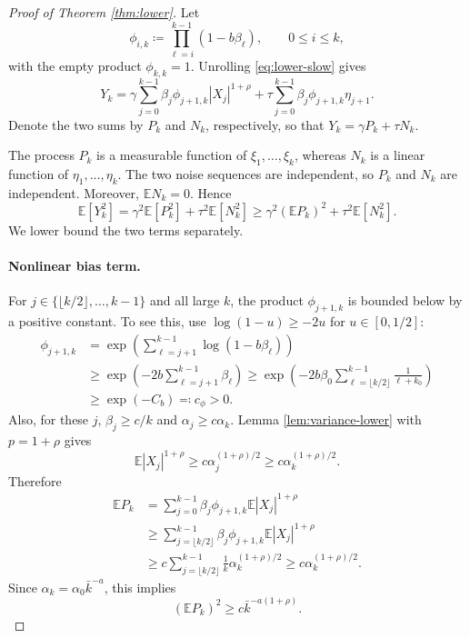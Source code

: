 \documentclass{article}
\newcommand{\E}{\mathbb{E}}
\begin{document}
\begin{proof}[Proof of Theorem \ref{thm:lower}]
Let
\[
  \phi_{i,k}\coloneqq \prod_{\ell=i}^{k-1}(1-b\beta_\ell),\qquad 0\le i\le k,
\]
with the empty product $\phi_{k,k}=1$. Unrolling \eqref{eq:lower-slow} gives
\begin{equation}
  Y_k=\gamma\sum_{j=0}^{k-1}\beta_j\phi_{j+1,k}|X_j|^{1+\rho}
      +\tau\sum_{j=0}^{k-1}\beta_j\phi_{j+1,k}\eta_{j+1}. \label{eq:Y-lower-unrolled}
\end{equation}
Denote the two sums by $P_k$ and $N_k$, respectively, so that $Y_k=\gamma P_k+\tau N_k$.

The process $P_k$ is a measurable function of $\xi_1,\ldots,\xi_k$, whereas $N_k$ is a linear function of $\eta_1,\ldots,\eta_k$. The two noise sequences are independent, so $P_k$ and $N_k$ are independent. Moreover, $\E N_k=0$. Hence
\begin{equation}
  \E[Y_k^2]
  =\gamma^2\E[P_k^2]+\tau^2\E[N_k^2]
  \ge \gamma^2(\E P_k)^2+\tau^2\E[N_k^2]. \label{eq:lower-split}
\end{equation}
We lower bound the two terms separately.

\paragraph{Nonlinear bias term.}
For $j\in\{\lfloor k/2\rfloor,\ldots,k-1\}$ and all large $k$, the product $\phi_{j+1,k}$ is bounded below by a positive constant. To see this, use $\log(1-u)\ge-2u$ for $u\in[0,1/2]$:
\[
\begin{aligned}
  \phi_{j+1,k}
  &=\exp\left(\sum_{\ell=j+1}^{k-1}\log(1-b\beta_\ell)\right)\\
  &\ge \exp\left(-2b\sum_{\ell=j+1}^{k-1}\beta_\ell\right)
   \ge \exp\left(-2b\beta_0\sum_{\ell=\lfloor k/2\rfloor}^{k-1}\frac1{\ell+k_0}\right)\\
  &\ge \exp(-C_b)\eqqcolon c_\phi>0.
\end{aligned}
\]
Also, for these $j$, $\beta_j\ge c/k$ and $\alpha_j\ge c\alpha_k$. Lemma \ref{lem:variance-lower} with $p=1+\rho$ gives
\[
  \E|X_j|^{1+\rho}\ge c\alpha_j^{(1+\rho)/2}
  \ge c\alpha_k^{(1+\rho)/2}.
\]
Therefore
\[
\begin{aligned}
  \E P_k
  &=\sum_{j=0}^{k-1}\beta_j\phi_{j+1,k}\E|X_j|^{1+\rho}\\
  &\ge \sum_{j=\lfloor k/2\rfloor}^{k-1}\beta_j\phi_{j+1,k}\E|X_j|^{1+\rho}\\
  &\ge c\sum_{j=\lfloor k/2\rfloor}^{k-1}\frac1{k}\alpha_k^{(1+\rho)/2}
   \ge c\alpha_k^{(1+\rho)/2}.
\end{aligned}
\]
Since $\alpha_k=\alpha_0\bar k^{-a}$, this implies
\begin{equation}
  (\E P_k)^2\ge c\bar k^{-a(1+\rho)}. \label{eq:P-lower}
\end{equation}


\end{proof}
\end{document}
